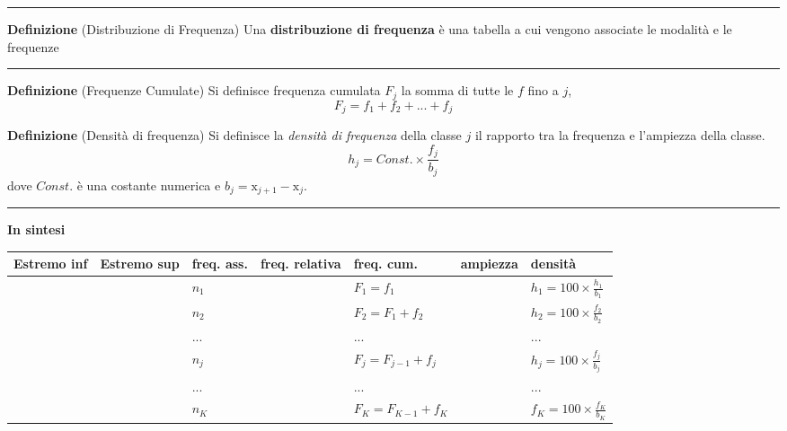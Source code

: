 \documentclass[
  11pt,
]{book}
\theoremstyle{mytheoremstyle}
\theoremstyle{mydefstyle}
\begin{document}
\begin{center}\rule{0.5\linewidth}{0.5pt}\end{center}

\textbf{Definizione} (Distribuzione di Frequenza)
Una \textbf{distribuzione di frequenza} è una tabella a cui vengono associate le modalità e le frequenze

\begin{center}\rule{0.5\linewidth}{0.5pt}\end{center}

\textbf{Definizione} (Frequenze Cumulate)
Si definisce frequenza cumulata \(F_j\) la somma di tutte le \(f\) fino a \(j\),
\[
F_j = f_1 + f_2 + ... + f_j
\]

\textbf{Definizione} (Densità di frequenza)
Si definisce la \emph{densità di frequenza} della classe \(j\) il rapporto tra la frequenza e l'ampiezza della classe.
\[h_j = Const.\times \frac {f_j} {b_j}\]
dove \(Const.\) è una costante numerica e \(b_j=\text{x}_{j+1}-\text{x}_{j}\).

\begin{center}\rule{0.5\linewidth}{0.5pt}\end{center}

\textbf{In sintesi}
\vspace{10pt}\scriptsize

\begin{tabular}{>{}l>{}ll>{}ll>{}ll}
\toprule
Estremo inf & Estremo sup & freq. ass. & freq. relativa & freq. cum. & ampiezza & densità\\
\midrule
\cellcolor{white}{$[\text{x}_1,$} & \cellcolor{white}{$\text{x}_2)$} & $n_1$ & \cellcolor{white}{$f_1=\frac{n_1}{n}$} & $F_1=f_1$ & \cellcolor{white}{$b_1=\text{x}_2-\text{x}_1$} & $h_1=100\times \frac{ h_1}{b_1}$\\
\cellcolor{white}{$[\text{x}_2,$} & \cellcolor{white}{$\text{x}_3)$} & $n_2$ & \cellcolor{white}{$f_2=\frac{n_2}n$} & $F_2=F_1+f_2$ & \cellcolor{white}{$b_2=\text{x}_3-\text{x}_2$} & $h_2=100\times \frac{ f_2}{b_2}$\\
\cellcolor{white}{$...$} & \cellcolor{white}{$...$} & $...$ & \cellcolor{white}{$...$} & $...$ & \cellcolor{white}{$...$} & \vphantom{1} $...$\\
\cellcolor{white}{$[\text{x}_j,$} & \cellcolor{white}{$\text{x}_{j+1})$} & $n_j$ & \cellcolor{white}{$f_j=\frac{n_j}n$} & $F_j=F_{j-1}+f_j$ & \cellcolor{white}{$b_j=\text{x}_{j+1}-\text{x}_j$} & $h_j=100\times \frac{ f_j}{b_j}$\\
\cellcolor{white}{$...$} & \cellcolor{white}{$...$} & $...$ & \cellcolor{white}{$...$} & $...$ & \cellcolor{white}{$...$} & $...$\\
\cellcolor{white}{$[\text{x}_K,$} & \cellcolor{white}{$\text{x}_{K+1})$} & $n_K$ & \cellcolor{white}{$f_K=\frac{n_K}n$} & $F_K=F_{K-1}+f_K$ & \cellcolor{white}{$b_K=\text{x}_{K+1}-\text{x}_K$} & $f_K=100\times \frac{ f_K}{b_K}$\\
\bottomrule
\end{tabular}
\end{document}
